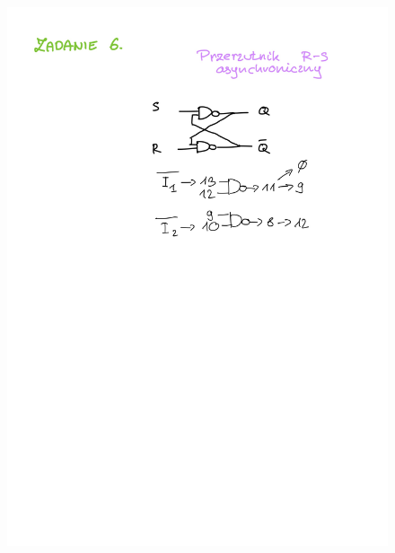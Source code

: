 \documentclass[14pt, table]{extarticle}
\begin{document}
\begin{figure}[H]
\includegraphics[scale=0.2]{B4}
\centering
\captionsetup{labelformat=empty}
\caption{}
\end{figure}
\end{document}
